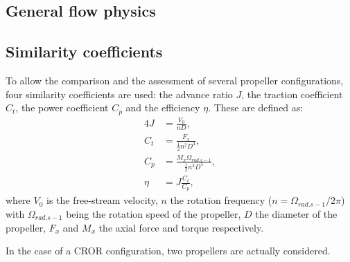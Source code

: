 \subsection{General flow physics} %
\label{sub:general_flow_physics}


\subsection{Similarity coefficients}
\label{sub:ca_similarity_coeff}

To allow the comparison and the assessment of several
propeller configurations, four similarity coefficients are used:
the advance ratio $J$, the traction coefficient $C_t$, 
the power coefficient $C_p$ and the efficiency $\eta$.
These are defined as:
\begin{alignat}{4}
    J &= \frac{V_0}{n D} \label{eq:advance_ratio}, \\
    C_t &= \frac{F_x}{\frac{1}{2} n ^ 2  D ^ 4}, \\
    C_p &= \frac{M_x \Omega_{rad.s-1}}{\frac{1}{2} n ^ 3 D ^ 5}, \\
    \eta &= J \frac{C_t}{C_p},
\end{alignat}
where $V_0$ is the free-stream velocity, 
$n$ the rotation frequency ($n = \Omega_{rad.s-1} / 2 \pi$) with 
$\Omega_{rad.s-1}$ being the rotation speed of the propeller, $D$ the diameter
of the propeller, $F_x$ and $M_x$ the axial force and torque respectively.

In the case of a CROR configuration, two propellers are actually considered.
